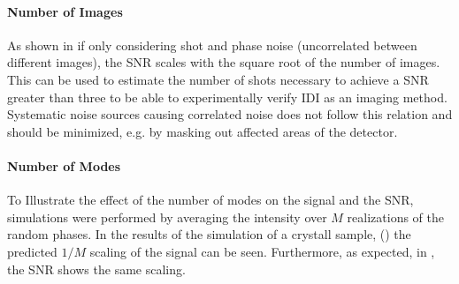 \paragraph{Number of Images}
As shown in  if only considering shot and phase noise (uncorrelated between different  images), the SNR scales with the square root of the number of images.  This can be used to estimate the number of shots necessary to achieve a SNR greater than three to be able to experimentally verify IDI as an imaging method. Systematic noise sources causing correlated noise does not follow this relation and should be minimized, e.g. by masking out affected areas of the detector.
 
\paragraph{Number of Modes}
To Illustrate the effect of the number of modes on the signal and the SNR, simulations were performed by averaging the intensity over $M$ realizations of the random phases.  In the results of the simulation of a crystall sample, () the predicted $1/M$ scaling of the signal can be seen. Furthermore, as expected, in , the SNR shows the same scaling.


